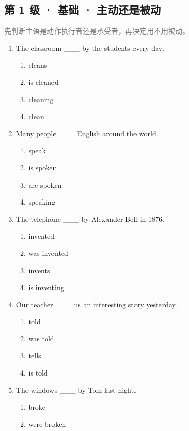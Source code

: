 \documentclass[11pt,a4paper]{ctexart}
\begin{document}
\subsection*{第 1 级 · 基础 · 主动还是被动}
\noindent\textcolor{gray}{先判断主语是动作执行者还是承受者，再决定用不用被动。}\par\smallskip
\begin{enumerate}[leftmargin=*,itemsep=4pt]
\item The classroom \_\_\_ by the students every day.
\begin{enumerate}[label=\Alph*.,leftmargin=2em,itemsep=1pt,topsep=2pt]
\item cleans
\item is cleaned
\item cleaning
\item clean
\end{enumerate}
\item Many people \_\_\_ English around the world.
\begin{enumerate}[label=\Alph*.,leftmargin=2em,itemsep=1pt,topsep=2pt]
\item speak
\item is spoken
\item are spoken
\item speaking
\end{enumerate}
\item The telephone \_\_\_ by Alexander Bell in 1876.
\begin{enumerate}[label=\Alph*.,leftmargin=2em,itemsep=1pt,topsep=2pt]
\item invented
\item was invented
\item invents
\item is inventing
\end{enumerate}
\item Our teacher \_\_\_ us an interesting story yesterday.
\begin{enumerate}[label=\Alph*.,leftmargin=2em,itemsep=1pt,topsep=2pt]
\item told
\item was told
\item tells
\item is told
\end{enumerate}
\item The windows \_\_\_ by Tom last night.
\begin{enumerate}[label=\Alph*.,leftmargin=2em,itemsep=1pt,topsep=2pt]
\item broke
\item were broken

\end{enumerate}
\end{enumerate}
\end{document}
